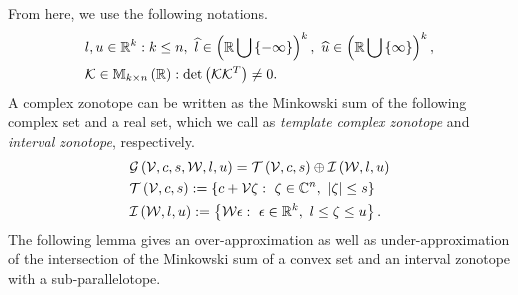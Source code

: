 %
From here, we use the
following notations.
%
\begin{align*}
& l,u\in\mathbb{R}^k:k\leq
n,~\widehat{l}\in\left(\mathbb{R}\bigcup\left\{-\infty\right\}\right)^k,~\widehat{u}\in\left(\mathbb{R}\bigcup\left\{\infty\right\}\right)^k,\\
& \mathcal{K}\in\mathbb{M}_{k\times n}\left(\mathbb{R}\right):\det\left(\mathcal{K}{\mathcal{K}}^T\right)\neq 0.
\end{align*}
%
A complex zonotope can be written as the Minkowski sum of the
following complex set and a real set, which we call as \emph{template complex zonotope}
and \emph{interval zonotope}, respectively.
%
\begin{align*}
& \mathcal{G}\left(\mathcal{V},c,s,\mathcal{W},l,u\right)  =\mathit{\operatorname{\mathcal{T}}}\left(\mathcal{V},c,s\right)\oplus\mathit{\operatorname{\mathcal{I}}}\left(\mathcal{W},l,u\right)\\
& \mathit{\operatorname{\mathcal{T}}}\left(\mathcal{V},c,s\right):= \left\{c+\mathcal{V}\zeta:~\zeta\in\mathbb{C}^n,~\left|\zeta\right|\leq s\right\}\\
& \mathit{\operatorname{\mathcal{I}}}\left(\mathcal{W},l,u\right):=\left\{\mathcal{W}\epsilon:~\epsilon\in\mathbb{R}^k,~l\leq\zeta\leq u\right\}.
\end{align*}
%
The following lemma gives an over-approximation as well as
under-approximation of the intersection of the Minkowski sum of a
convex set and an interval zonotope with a sub-parallelotope.


